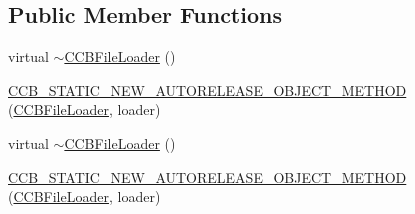 \subsection*{Public Member Functions}
\begin{DoxyCompactItemize}
\item 
virtual \hyperlink{classcocosbuilder_1_1CCBFileLoader_a360a0b863e7f1f22a28bf3de9678a16d}{$\sim$\+C\+C\+B\+File\+Loader} ()
\item 
\hyperlink{classcocosbuilder_1_1CCBFileLoader_a7ea060ece425a721901c3a4873238716}{C\+C\+B\+\_\+\+S\+T\+A\+T\+I\+C\+\_\+\+N\+E\+W\+\_\+\+A\+U\+T\+O\+R\+E\+L\+E\+A\+S\+E\+\_\+\+O\+B\+J\+E\+C\+T\+\_\+\+M\+E\+T\+H\+OD} (\hyperlink{classcocosbuilder_1_1CCBFileLoader}{C\+C\+B\+File\+Loader}, loader)
\item 
virtual \hyperlink{classcocosbuilder_1_1CCBFileLoader_a360a0b863e7f1f22a28bf3de9678a16d}{$\sim$\+C\+C\+B\+File\+Loader} ()
\item 
\hyperlink{classcocosbuilder_1_1CCBFileLoader_a7ea060ece425a721901c3a4873238716}{C\+C\+B\+\_\+\+S\+T\+A\+T\+I\+C\+\_\+\+N\+E\+W\+\_\+\+A\+U\+T\+O\+R\+E\+L\+E\+A\+S\+E\+\_\+\+O\+B\+J\+E\+C\+T\+\_\+\+M\+E\+T\+H\+OD} (\hyperlink{classcocosbuilder_1_1CCBFileLoader}{C\+C\+B\+File\+Loader}, loader)
\end{DoxyCompactItemize}
